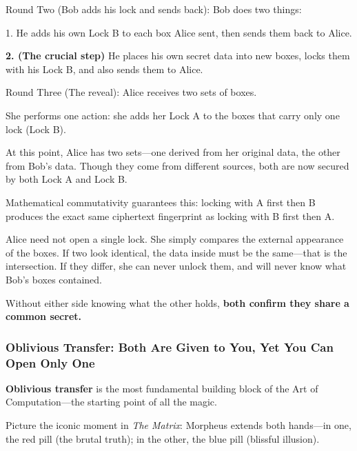 \vspace{1em}

Round Two (Bob adds his lock and sends back): Bob does two things:

1. He adds his own Lock B to each box Alice sent, then sends them back to Alice.

\textbf{2. (The crucial step)} He places his own secret data into new boxes, locks them with his Lock B, and also sends them to Alice.

\vspace{1em}

Round Three (The reveal): Alice receives two sets of boxes.

She performs one action: she adds her Lock A to the boxes that carry only one lock (Lock B).

At this point, Alice has two sets---one derived from her original data, the other from Bob's data. Though they come from different sources, both are now secured by both Lock A and Lock B.

Mathematical commutativity guarantees this: locking with A first then B produces the exact same ciphertext fingerprint as locking with B first then A.

\vspace{1em}

Alice need not open a single lock. She simply compares the external appearance of the boxes. If two look identical, the data inside must be the same---that is the intersection. If they differ, she can never unlock them, and will never know what Bob's boxes contained.


\begin{importantbox}
Without either side knowing what the other holds, \textbf{both confirm they share a common secret.}
\end{importantbox}

\newpage
{}
{}
\subsubsection{Oblivious Transfer: Both Are Given to You, Yet You Can Open Only One}

\textbf{Oblivious transfer} is the most fundamental building block of the Art of Computation---the starting point of all the magic.

Picture the iconic moment in \textit{The Matrix}: Morpheus extends both hands---in one, the red pill (the brutal truth); in the other, the blue pill (blissful illusion).

